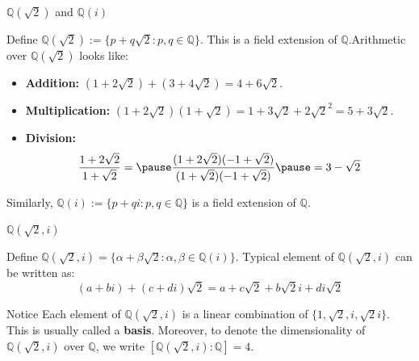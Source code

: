 \documentclass{beamer}
\begin{document}
    \begin{frame}{$\mathbb{Q}(\sqrt{2})$ and $\mathbb{Q}(i)$}
        \begin{example}
            Define $\mathbb{Q}(\sqrt{2}) := \{p+q\sqrt{2}: p,q \in \mathbb{Q}\}$. This is a field extension of $\mathbb{Q}$.\pause Arithmetic over $\mathbb{Q}(\sqrt{2})$ looks like:
            \begin{itemize}
                \item \textbf{Addition:} $(1+2\sqrt{2})+(3+4\sqrt{2})=4+6\sqrt{2}$.\pause
                \item \textbf{Multiplication:} $(1+2\sqrt{2})(1+\sqrt{2}) = 1+3\sqrt{2}+2\sqrt{2}^2 = 5+3\sqrt{2}$.\pause
                \item \textbf{Division:} 
                \begin{equation*}
                    \frac{1+2\sqrt{2}}{1+\sqrt{2}}=\pause\frac{(1+2\sqrt{2})(-1+\sqrt{2})}{(1+\sqrt{2})(-1+\sqrt{2})}\pause = 3-\sqrt{2}
                \end{equation*}
            \end{itemize}
        \end{example}

        \begin{example}
            Similarly, $\mathbb{Q}(i) := \{p+qi: p,q \in \mathbb{Q}\}$ is a field extension of $\mathbb{Q}$.
        \end{example}
    \end{frame}

    \begin{frame}{$\mathbb{Q}(\sqrt{2}, i)$}
        \begin{example}
            Define $\mathbb{Q}(\sqrt{2}, i) = \{\alpha+\beta\sqrt{2}: \alpha,\beta \in \mathbb{Q}(i)\}$. Typical element of $\mathbb{Q}(\sqrt{2}, i)$ can be written as:\pause
            \begin{equation*}
                (a+bi) + (c+di)\sqrt{2} = a+c\sqrt{2} + b\sqrt{2}i + di\sqrt{2} 
            \end{equation*}
        \end{example}

        \begin{block}{Notice}
            Each element of $\mathbb{Q}(\sqrt{2}, i)$ is a linear combination of $\{1,\sqrt{2},i,\sqrt{2}i\}$. This is usually called a \textbf{basis}. Moreover, to denote the dimensionality of $\mathbb{Q}(\sqrt{2}, i)$ over $\mathbb{Q}$, we write $[\mathbb{Q}(\sqrt{2}, i):\mathbb{Q}]=4$.
        \end{block}
    \end{frame}
\end{document}
